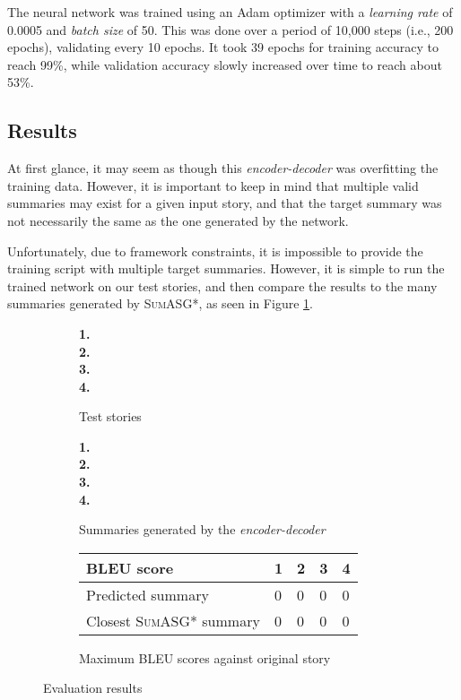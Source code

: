 The neural network was trained using an Adam optimizer with a \textit{learning rate} of 0.0005 and \textit{batch size} of 50. This was done over a period of 10,000 steps (i.e., 200 epochs), validating every 10 epochs. It took 39 epochs for training accuracy to reach 99\%, while validation accuracy slowly increased over time to reach about 53\%.

\subsection{Results}

At first glance, it may seem as though this \textit{encoder-decoder} was overfitting the training data. However, it is important to keep in mind that multiple valid summaries may exist for a given input story, and that the target summary was not necessarily the same as the one generated by the network.

Unfortunately, due to framework constraints, it is impossible to provide the training script with multiple target summaries. However, it is simple to run the trained network on our test stories, and then compare the results to the many summaries generated by \textsc{SumASG*}, as seen in Figure \ref{fig:neural_network_testing}.

\begin{figure}[H]
\begin{subfigure}{\textwidth}
\begin{displayquote}
\textbf{1.}\\
\textbf{2.}\\
\textbf{3.}\\
\textbf{4.}\\
\end{displayquote}
\caption{Test stories}
\end{subfigure}
\begin{subfigure}{\textwidth}
\vspace{\baselineskip}
\begin{displayquote}
\textbf{1.}\\
\textbf{2.}\\
\textbf{3.}\\
\textbf{4.}\\
\end{displayquote}
\caption{Summaries generated by the \textit{encoder-decoder}}
\end{subfigure}
\begin{subfigure}{\textwidth}
\vspace{\baselineskip}
\centering
\begin{tabular}{@{}lllll@{}}
\toprule
BLEU score                                        & 1 & 2 & 3 & 4 \\ \midrule
Predicted summary                                 & 0 & 0 & 0 & 0 \\
Closest \textsc{SumASG*} summary & 0 & 0 & 0 & 0 \\ \bottomrule
\end{tabular}
\caption{Maximum BLEU scores against original story}
\end{subfigure}
\caption{Evaluation results}
\label{fig:neural_network_testing}
\end{figure}

